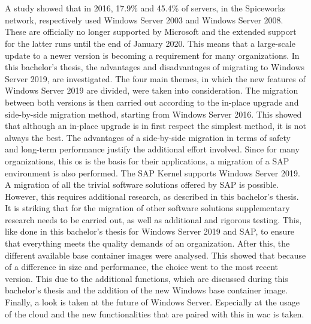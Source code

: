 \chapter*{}
A study showed that in 2016, 17.9\% and 45.4\% of servers, in the Spiceworks network, respectively used Windows Server 2003 and Windows Server 2008. \autocite{Tsai2016} 
These are officially no longer supported by Microsoft and the extended support for the latter runs until the end of January 2020. 
This means that a large-scale update to a newer version is becoming a requirement for many organizations. 
In this bachelor's thesis, the advantages and disadvantages of migrating to Windows Server 2019, are investigated. 
The four main themes, in which the new features of Windows Server 2019 are divided, were taken into consideration. 
The migration between both versions is then carried out according to the in-place upgrade and side-by-side migration method, starting from Windows Server 2016. 
This showed that although an in-place upgrade is in first respect the simplest method, it is not always the best. 
The advantages of a side-by-side migration in terms of safety and long-term performance justify the additional effort involved.
Since for many organizations, this \acrshort{os} is the basis for their applications, a migration of a SAP environment is also performed. 
The SAP Kernel supports Windows Server 2019. 
A migration of all the trivial software solutions offered by SAP is possible.
However, this requires additional research, as described in this bachelor's thesis.
It is striking that for the migration of other software solutions supplementary research needs to be carried out, as well as additional and rigorous testing. 
This, like done in this bachelor's thesis for Windows Server 2019 and SAP, to ensure that everything meets the quality demands of an organization.
After this, the different available base container images were analysed. 
This showed that because of a difference in size and performance, the choice went to the most recent version. 
This due to the additional functions, which are discussed during this bachelor's thesis and the addition of the new Windows base container image.
Finally, a look is taken at the future of Windows Server. 
Especially at the usage of the cloud and the new functionalities that are paired with this in \acrlong{wac} is taken. 
